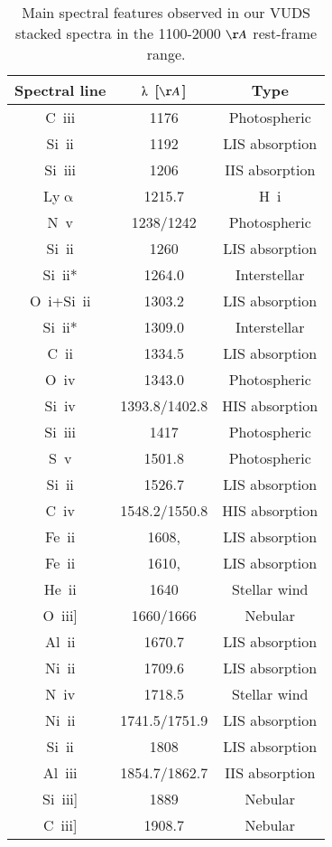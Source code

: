 \documentclass[longauth]{aa}
\begin{document}
\begin{table}
\centering
\caption{\label{Tbl:Lines}
Main spectral features observed in our VUDS stacked 
spectra in the 1100-2000 $\AA$ rest-frame range.}
\begin{tabular}{ccc}
  \\
  \hline\hline
  \multicolumn{1}{c}{Spectral line} &
  \multicolumn{1}{c}{$\lambdaup$ [$\AA$]} &
  \multicolumn{1}{c}{Type} \\
  \hline\hline  
C  \,{\sc iii} & 1176 & Photospheric \\
Si \,{\sc ii}  & 1192 & LIS absorption \\
Si \,{\sc iii} & 1206 & IIS absorption \\
Ly$\upalpha$   & 1215.7 & H \,{\sc i} \\
N \,{\sc v}    & 1238/1242 & Photospheric \\ 
Si \,{\sc ii}  & 1260 & LIS absorption \\
Si \,{\sc ii*} & 1264.0 & Interstellar \\
O \,{\sc i}+Si \,{\sc ii}& 1303.2 & LIS absorption \\
Si \,{\sc ii*} & 1309.0 & Interstellar \\
C \,{\sc ii}   & 1334.5 & LIS absorption \\
O \,{\sc iv}   & 1343.0 & Photospheric \\
Si \,{\sc iv}  &  1393.8/1402.8  & HIS absorption\\
Si \,{\sc iii} & 1417 & Photospheric \\
S \,{\sc v}    & 1501.8 & Photospheric \\
Si \,{\sc ii}  & 1526.7 & LIS absorption \\
C \,{\sc iv}   &  1548.2/1550.8 & HIS absorption\\
Fe \,{\sc ii}  & 1608, & LIS absorption \\
Fe \,{\sc ii}  & 1610, & LIS absorption \\
He \,{\sc ii}  & 1640  & Stellar wind \\
O \,{\sc iii]} &  1660/1666 & Nebular \\
Al \,{\sc ii}  & 1670.7  & LIS absorption \\
Ni \,{\sc ii}  & 1709.6 & LIS absorption \\
N \,{\sc iv}   & 1718.5 & Stellar wind \\
Ni \,{\sc ii}  &  1741.5/1751.9 & LIS absorption \\
Si \,{\sc ii}  & 1808 & LIS absorption \\
Al \,{\sc iii} &  1854.7/1862.7 & IIS absorption \\
Si \,{\sc iii]}& 1889 & Nebular \\
C \,{\sc iii]} & 1908.7 & Nebular \\
\hline
\end{tabular}
\end{table}
\end{document}
